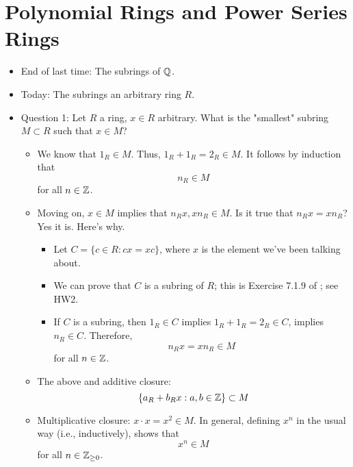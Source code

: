 \documentclass[../notes.tex]{subfiles}
\begin{document}
\section{Polynomial Rings and Power Series Rings}
\begin{itemize}
    \item {}End of last time: The subrings of $\mathbb{Q}$.
    \item Today: The subrings an arbitrary ring $R$.
    \item Question 1: Let $R$ a ring, $x\in R$ arbitrary. What is the "smallest" subring $M\subset R$ such that $x\in M$?
    \begin{itemize}
        \item We know that $1_R\in M$. Thus, $1_R+1_R=2_R\in M$. It follows by induction that
        \begin{equation*}
            n_R \in M
        \end{equation*}
        for all $n\in\mathbb{Z}$.
        \item Moving on, $x\in M$ implies that $n_Rx,xn_R\in M$. Is it true that $n_Rx=xn_R$? Yes it is. Here's why.
        \begin{itemize}
            \item Let $C=\{c\in R:cx=xc\}$, where $x$ is the element we've been talking about.
            \item We can prove that $C$ is a subring of $R$; this is Exercise 7.1.9 of \textcite{bib:DummitFoote}; see HW2.
            \item If $C$ is a subring, then $1_R\in C$ implies $1_R+1_R=2_R\in C$, implies $n_R\in C$. Therefore,
            \begin{equation*}
                n_Rx=xn_R \in M
            \end{equation*}
            for all $n\in\mathbb{Z}$.
        \end{itemize}
        \item The above and additive closure:
        \begin{equation*}
            \{a_R+b_Rx:a,b\in\mathbb{Z}\} \subset M
        \end{equation*}
        \item Multiplicative closure: $x\cdot x=x^2\in M$. In general, defining $x^n$ in the usual way (i.e., inductively), shows that
        \begin{equation*}
            x^n \in M
        \end{equation*}
        for all $n\in{\mathbb{Z}_{\geq 0}}$.
        \begin{itemize}

\end{itemize}
\end{itemize}
\end{itemize}
\end{document}
